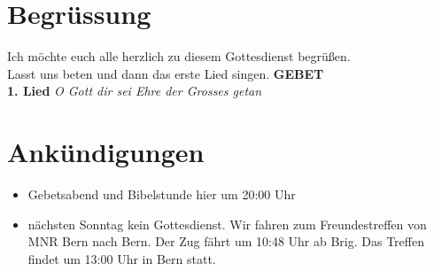 
\section{Begrüssung}

Ich möchte euch alle herzlich zu diesem Gottesdienst begrüßen.\\
Lasst uns beten und dann das erste Lied singen.
\textbf{GEBET}\\

\textbf{1. Lied}
\textit{O Gott dir sei Ehre der Grosses getan}

\section{Ankündigungen}
\begin{itemize}
    \item Gebetsabend und Bibelstunde hier um 20:00 Uhr
    \item nächsten Sonntag kein Gottesdienst. Wir fahren zum Freundestreffen von MNR Bern nach Bern. Der Zug fährt um 10:48 Uhr ab Brig. Das Treffen findet um 13:00 Uhr in Bern statt.
\end{itemize}

